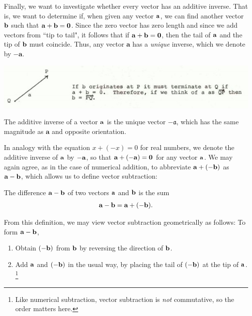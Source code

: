 \documentclass[12pt,letterpaper,reqno]{article}
\numberwithin{equation}{section}
\newcommand{\ti}[1]{\textit{#1}}
\begin{document}
Finally, we want to investigate whether every vector has an additive inverse. That is, we want to determine if, when given any vector ${\bf a}$, we can find another vector ${\bf b}$ such that ${\bf a}+{\bf b}={\bf 0}$. Since the zero vector has zero length and since we add vectors from ``tip to tail", it follows that if ${\bf a}+{\bf b}={\bf 0}$, then the tail of ${\bf a}$ and the tip of ${\bf b}$ must coincide. Thus, any vector $\mathbf{a}$ has a \emph{unique} inverse, which we denote by $-\mathbf{a}$.   
\begin{center}
	\includegraphics[scale=0.5]{figures_mvc/a_plus_b_equals_zero}
\end{center} 
\begin{defn}
The additive inverse of a vector ${\bf a}$ is the unique vector $-\mathfrak{a}$, which has the same magnitude as $\mathbf{a}$ and opposite orientation.
\end{defn}
In analogy with the equation $x+(-x)=0$ for real numbers, we denote the additive inverse of ${\bf a}$ by $-{\bf a}$, so that ${\bf a}+(-{\bf a})={\bf 0}$ for any vector ${\bf a}$. We may again agree, as in the case of numerical addition, to abbreviate ${\bf a}+(-{\bf b})$ as ${\bf a}-{\bf b}$, which allows us to define vector subtraction:

\begin{defn}
	The difference ${\bf a}-{\bf b}$ of two vectors ${\bf a}$ and ${\bf b}$ is the sum
	\begin{align*}
		{\bf a}-{\bf b}={\bf a}+(-{\bf b}).
	\end{align*}
\end{defn}
From this definition, we may view vector subtraction geometrically as follows: To form ${\bf a}-{\bf b}$,
\begin{enumerate}[(1)]
	\item Obtain $(-{\bf b})$ from ${\bf b}$ by reversing the direction of ${\bf b}$.
	\item Add ${\bf a}$ and $(-{\bf b})$ in the usual way, by placing the tail of $(-{\bf b})$ at the tip of ${\bf a}$. \footnote{Like numerical subtraction, vector subtraction is \ti{not} commutative, so the order matters here.}
\end{enumerate}
\end{document}
